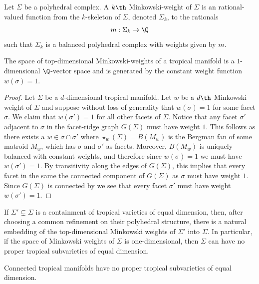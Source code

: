 \begin{definition}
    Let $\Sigma$ be a polyhedral complex. A $k\th$ Minkowski-weight of $\Sigma$ is an rational-valued function from the $k$-skeleton of $\Sigma$, denoted $\Sigma_k$, to the rationals
    \begin{align*}
        m:\Sigma_k \to \Q
    \end{align*}
    such that $\Sigma_k$ is a balanced polyhedral complex with weights given by $m$. 
\end{definition}


\begin{corollary}\label{cor:minkWeights}
The space of top-dimensional Minkowski-weights of a tropical manifold is a $1$-dimensional $\Q$-vector space and is generated by the constant weight function $w(\sigma)=1$. 
\end{corollary}
\begin{proof}
    Let $\Sigma$ be a $d$-dimensional tropical manifold. Let $w$ be a $d\th$ Minkowski weight of $\Sigma$ and suppose without loss of generality that $w(\sigma)=1$ for some facet $\sigma$. We claim that $w(\sigma')=1$ for all other facets of $\Sigma$. Notice that any facet $\sigma'$ adjacent to $\sigma$ in the facet-ridge graph $G(\Sigma)$ must have weight $1$. This follows as there exists a $w\in \sigma\cap\sigma'$ where $\star_w(\Sigma)=B(M_w)$ is the Bergman fan of some matroid $M_w$, which has $\sigma$ and $\sigma'$ as facets. Moreover, $B(M_w)$ is uniquely balanced with constant weights, and therefore since $w(\sigma)=1$ we must have $w(\sigma')=1$. By transitivity along the edges of $G(\Sigma)$, this implies that every facet in the same the connected component of $G(\Sigma)$ as $\sigma$ must have weight $1$. Since $G(\Sigma)$ is connected by  we see that every facet $\sigma'$ must have weight $w(\sigma')=1$.
    
\end{proof}
If $\Sigma'\subsetneq \Sigma$ is a containment of tropical varieties of equal dimension, then, after choosing a common refinement on their polyhedral structure, there is a natural embedding of the top-dimensional Minkowski weights of $\Sigma'$ into $\Sigma$. In particular, if the space of Minkowski weights of $\Sigma$ is one-dimensional, then $\Sigma$ can have no proper tropical subvarieties of equal dimension.

\begin{corollary}
    Connected tropical manifolds have no proper tropical subvarieties of equal dimension.
\end{corollary}

